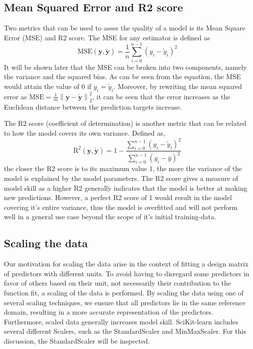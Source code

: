\documentclass[11pt, a4paper]{article}
\begin{document}
\subsection*{Mean Squared Error and R2 score}
Two metrics that can be used to asses the quality of a model is its Mean Square Error (MSE) and R2 score. The MSE for any estimator is defined as
\[
  \text{MSE}(\boldsymbol{y},\boldsymbol{\tilde{y}}) = \frac{1}{n}
  \sum_{i=0}^{n-1}(y_i-\tilde{y}_i)^2
\]
It will be shown later that the MSE can be broken into two components, namely the variance and the squared bias. As can be seen from the equation, the MSE would attain the value of 0 if $y_i = \tilde{y}_i$. Moreover, by rewriting the mean squared error as $\text{MSE} = \frac{1}{m}\left\lVert \bm{y} - \bm{\tilde{y}}\right\rVert_2^2$, it can be seen that the error increases as the Euclidean distance between the prediction targets increase. \cite{Goodfellow2016}

The R2 score (coefficient of determination) is another metric that can be related to how the model covers its own variance. Defined as,
\[
  \text{R}^2(\boldsymbol{y}, \tilde{\boldsymbol{y}}) = 1 - \frac{\sum_{i=0}^{n - 1} (y_i - \tilde{y}_i)^2}{\sum_{i=0}^{n - 1} (y_i - \bar{y})^2}
\] the closer the R2 score is to its maximum value 1, the more the variance of the model is explained by the model parameters. The R2 score gives a measure of model skill as a higher R2 generally indicates that the model is better at making new predictions. However, a perfect R2 score of 1 would result in the model covering it's entire variance, thus the model is overfitted and will not perform well in a general use case beyond the scope of it's initial training-data.

\subsection*{Scaling the data}
Our motivation for scaling the data arise in the context of fitting a design matrix of predictors with different units. To avoid having to disregard some predictors in favor of others based on their unit, not necessarily their contribution to the function fit, a scaling of the data is performed. By scaling the data using one of several scaling techniques, we ensure that all predictors lie in the same reference domain, resulting in a more accurate representation of the predictors. Furthermore, scaled data generally increases model skill. SciKit-learn includes several different Scalers, such as the StandardScaler and MinMaxScaler. \cite{scikit-learn} For this discussion, the StandardScaler will be inspected.
\end{document}
